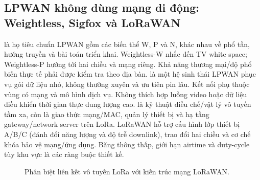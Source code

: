 \subsection{LPWAN không dùng mạng di động: Weightless, Sigfox và LoRaWAN}
 là họ tiêu chuẩn LPWAN gồm các biến thể W, P và N, khác nhau về phổ tần, hướng truyền và bài toán triển khai. Weightless-W nhắc đến TV white space; Weightless-P hướng tới hai chiều và mạng riêng. Khả năng thương mại/độ phổ biến thực tế phải được kiểm tra theo địa bàn.
 là một hệ sinh thái LPWAN phục vụ gói dữ liệu nhỏ, không thường xuyên và ưu tiên pin lâu. Kết nối phụ thuộc vùng có mạng và mô hình dịch vụ. Không thích hợp luồng video hoặc dữ liệu điều khiển thời gian thực dung lượng cao.
 là kỹ thuật điều chế/vật lý vô tuyến tầm xa, còn  là giao thức mạng/MAC, quản lý thiết bị và hạ tầng gateway/network server trên LoRa. LoRaWAN hỗ trợ cấu hình lớp thiết bị A/B/C (đánh đổi năng lượng và độ trễ downlink), trao đổi hai chiều và cơ chế khóa bảo vệ mạng/ứng dụng. Băng thông thấp, giới hạn airtime và duty-cycle tùy khu vực là các ràng buộc thiết kế.
\begin{figure}[htbp]\centering
{}\caption{Phân biệt liên kết vô tuyến LoRa với kiến trúc mạng LoRaWAN.}
\end{figure}
